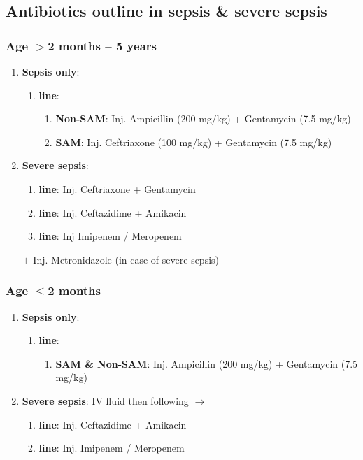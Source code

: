 \documentclass[11pt,a4paper]{report}
\begin{document}
\newpage
\subsection{Antibiotics outline in sepsis \& severe sepsis}
\subsubsection{Age $>$2 months -- 5 years}
\begin{enumerate}
	\item \textbf{Sepsis only}:
	\begin{enumerate}
		\item \textbf{ line}: 
		\begin{enumerate}
			\item \textbf{Non-SAM}: Inj. Ampicillin (200 mg/kg) + Gentamycin (7.5 mg/kg)
			\item \textbf{SAM}: Inj. Ceftriaxone (100 mg/kg) + Gentamycin (7.5 mg/kg)
		\end{enumerate}
	\end{enumerate}
	\item \textbf{Severe sepsis}: %
	\begin{enumerate}
		\item \textbf{ line}: Inj. Ceftriaxone + Gentamycin 
		\item \textbf{ line}: Inj. Ceftazidime + Amikacin 
		\item \textbf{ line}: Inj Imipenem / Meropenem 
	\end{enumerate}
	$+$ Inj. Metronidazole (in case of severe sepsis)
\end{enumerate}


\subsubsection{Age $\leq$2 months}
\begin{enumerate}
	\item \textbf{Sepsis only}:
	\begin{enumerate}
		\item \textbf{ line}: 
		\begin{enumerate}
			\item \textbf{SAM \& Non-SAM}: Inj. Ampicillin (200 mg/kg) + Gentamycin (7.5 mg/kg)
		\end{enumerate}
	\end{enumerate}
	\item \textbf{Severe sepsis}:  IV fluid then following $\rightarrow$
	\begin{enumerate}
		\item \textbf{ line}: Inj. Ceftazidime + Amikacin 
		\item \textbf{ line}: Inj. Imipenem / Meropenem 
	\end{enumerate}
\end{enumerate}
\end{document}
